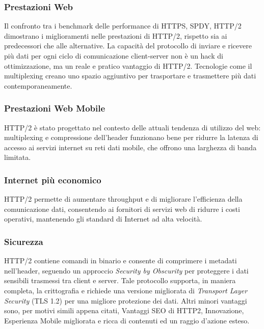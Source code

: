 \documentclass[a4paper,11pt]{article}
\begin{document}
\subsubsection{Prestazioni Web}
Il confronto tra i benchmark delle performance di HTTPS, SPDY, HTTP/2 dimostrano i miglioramenti nelle prestazioni di HTTP/2, rispetto sia ai predecessori che alle alternative.\newline
La capacità del protocollo di inviare e ricevere più dati per ogni ciclo di comunicazione client-server non è un hack di ottimizzazione, ma un reale e pratico vantaggio di HTTP/2.\newline
Tecnologie come il multiplexing creano uno spazio aggiuntivo per trasportare e trasmettere più dati contemporaneamente.
\subsubsection{Prestazioni Web Mobile}
HTTP/2 è stato progettato nel contesto delle attuali tendenza di utilizzo del web: multiplexing e compressione dell’header funzionano bene per ridurre la latenza di accesso ai servizi internet su reti dati mobile, che offrono una larghezza di banda limitata.
\subsubsection{Internet più economico}
HTTP/2 permette di aumentare throughput e di migliorare l’efficienza della comunicazione dati, consentendo ai fornitori di servizi web di ridurre i costi operativi, mantenendo gli standard di Internet ad alta velocità.
\subsubsection{Sicurezza}
HTTP/2 contiene comandi in binario e consente di comprimere i metadati nell’header, seguendo un approccio \textit{Security by Obscurity} per proteggere i dati sensibili trasmessi tra client e server.\newline
Tale protocollo supporta, in maniera completa, la crittografia e richiede una versione migliorata di \textit{Transport Layer Security} (TLS 1.2) per una migliore protezione dei dati.\bigbreak
\noindent Altri minori vantaggi sono, per motivi simili appena citati, Vantaggi SEO di HTTP2, Innovazione, Esperienza Mobile migliorata e ricca di contenuti ed un raggio d’azione esteso.
\end{document}
